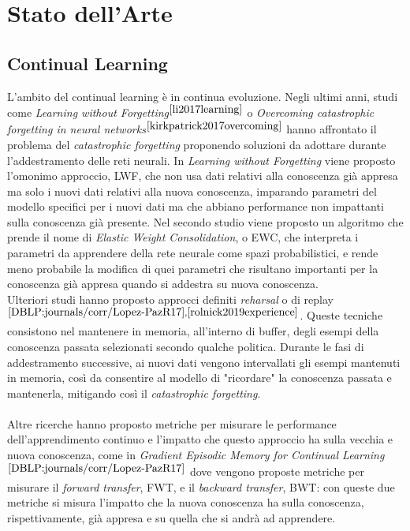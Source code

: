 \section{Stato dell'Arte}
\subsection{Continual Learning} L'ambito del continual learning è in continua evoluzione. Negli ultimi anni, studi come \textit{Learning without Forgetting}$^{\cite{li2017learning}}$ o \textit{Overcoming catastrophic forgetting in neural networks}$^{\cite{kirkpatrick2017overcoming}}$ hanno affrontato il problema del \textit{catastrophic forgetting} proponendo soluzioni da adottare durante l'addestramento delle reti neurali. In \textit{Learning without Forgetting} viene proposto l'omonimo approccio, LWF, che non usa dati relativi alla conoscenza già appresa ma solo i nuovi dati relativi alla nuova conoscenza, imparando parametri del modello specifici per i nuovi dati ma che abbiano performance non impattanti sulla conoscenza già presente. Nel secondo studio viene proposto un algoritmo che prende il nome di \textit{Elastic Weight Consolidation}, o EWC, che interpreta i parametri da apprendere della rete neurale come spazi probabilistici, e rende meno probabile la modifica di quei parametri che risultano importanti per la conoscenza già appresa quando si addestra su nuova conoscenza.\\
Ulteriori studi hanno proposto approcci definiti \textit{reharsal} o di replay$^{\cite{DBLP:journals/corr/Lopez-PazR17},\cite{rolnick2019experience}}$. Queste tecniche consistono nel mantenere in memoria, all'interno di buffer, degli esempi della conoscenza passata selezionati secondo qualche politica. Durante le fasi di addestramento successive, ai nuovi dati vengono intervallati gli esempi mantenuti in memoria, così da consentire al modello di "ricordare" la conoscenza passata e mantenerla, mitigando così il \textit{catastrophic forgetting}.\\\\
Altre ricerche hanno proposto metriche per misurare le performance dell'apprendimento continuo e l'impatto che questo approccio ha sulla vecchia e nuova conoscenza, come in \textit{Gradient Episodic Memory for Continual Learning}$^{\cite{DBLP:journals/corr/Lopez-PazR17}}$ dove vengono proposte metriche per misurare il \textit{forward transfer}, FWT, e il \textit{backward transfer}, BWT: con queste due metriche si misura l'impatto che la nuova conoscenza ha sulla conoscenza, rispettivamente, già appresa e su quella che si andrà ad apprendere.\\\\
